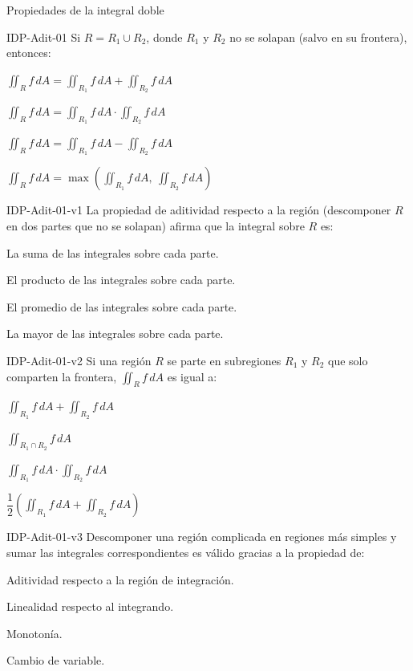 \documentclass[a4,11pt]{aleph-notas}
\begin{document}
\begin{quiz}{Propiedades de la integral doble}
\begin{multi}[]%
    {IDP-Adit-01}
    Si $R = R_1 \cup R_2$, donde $R_1$ y $R_2$ no se solapan (salvo en su frontera), entonces:
    \item* $\displaystyle\iint_R f\,dA = \iint_{R_1} f\,dA + \iint_{R_2} f\,dA$
    \item $\displaystyle\iint_R f\,dA = \iint_{R_1} f\,dA \cdot \iint_{R_2} f\,dA$
    \item $\displaystyle\iint_R f\,dA = \iint_{R_1} f\,dA - \iint_{R_2} f\,dA$
    \item $\displaystyle\iint_R f\,dA = \max\left(\iint_{R_1} f\,dA,\ \iint_{R_2} f\,dA\right)$
\end{multi}

\begin{multi}[]%
    {IDP-Adit-01-v1}
    La propiedad de aditividad respecto a la región (descomponer $R$ en dos partes que no se solapan) afirma que la integral sobre $R$ es:
    \item* La suma de las integrales sobre cada parte.
    \item El producto de las integrales sobre cada parte.
    \item El promedio de las integrales sobre cada parte.
    \item La mayor de las integrales sobre cada parte.
\end{multi}

\begin{multi}[]%
    {IDP-Adit-01-v2}
    Si una región $R$ se parte en subregiones $R_1$ y $R_2$ que solo comparten la frontera, $\displaystyle\iint_R f\,dA$ es igual a:
    \item* $\displaystyle\iint_{R_1} f\,dA + \iint_{R_2} f\,dA$
    \item $\displaystyle\iint_{R_1\cap R_2} f\,dA$
    \item $\displaystyle\iint_{R_1} f\,dA \cdot \iint_{R_2} f\,dA$
    \item $\dfrac{1}{2}\left(\displaystyle\iint_{R_1} f\,dA + \iint_{R_2} f\,dA\right)$
\end{multi}

\begin{multi}[]%
    {IDP-Adit-01-v3}
    Descomponer una región complicada en regiones más simples y sumar las integrales correspondientes es válido gracias a la propiedad de:
    \item* Aditividad respecto a la región de integración.
    \item Linealidad respecto al integrando.
    \item Monotonía.
    \item Cambio de variable.
\end{multi}


\end{quiz}
\end{document}
